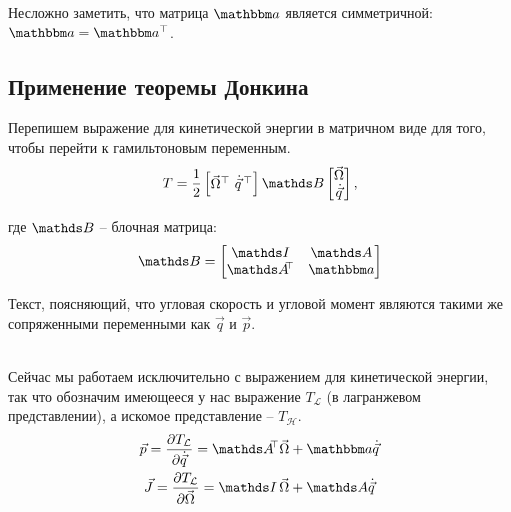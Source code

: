 Несложно заметить, что матрица $\bba$ является симметричной: $\bba = \bba^{\top}$.

\subsection{Применение теоремы Донкина}
Перепишем выражение для кинетической энергии в матричном виде для того, чтобы перейти к гамильтоновым переменным.
\begin{gather}
T = \frac{1}{2} 
\begin{bmatrix}
\vec{\Omega}^{\top} \ \dot{\vec{q}}^{\, \top}
\end{bmatrix}
\bbB
\begin{bmatrix}
\vec{\Omega} \\
\dot{\vec{q}}
\end{bmatrix}, \notag
\end{gather}

где $\bbB$ -- блочная матрица:
\begin{gather}
\bbB = 
\begin{bmatrix}
\bbI & \bbA \\
\bbA^{\dn \top} & \bba
\end{bmatrix} \notag
\end{gather}  

\begin{minipage}[c]{0.55\linewidth}
\end{minipage}
\begin{minipage}[c]{0.4\linewidth}
Текст, поясняющий, что угловая скорость и угловой момент являются такими же сопряженными переменными как $\vec{q}$ и $\vec{p}$.
\end{minipage} \\

Сейчас мы работаем исключительно с выражением для кинетической энергии, так что обозначим имеющееся у нас выражение $T_\mathcal{L}$ (в лагранжевом представлении), а искомое представление -- $T_\mathcal{H}$.
\vverh
\begin{gather}
\vec{p} = \frac{\partial T_\mathcal{L}}{\partial \dot{\vec{q}}} = \bbA^{\dn \top} \vec{\Omega} + \bba \dot{\vec{q}} \notag \\
\vec{J} = \frac{\partial T_\mathcal{L}}{\partial \vec{\Omega}} = \bbI \, \vec{\Omega} + \bbA \dot{\vec{q}} \notag
\end{gather}

